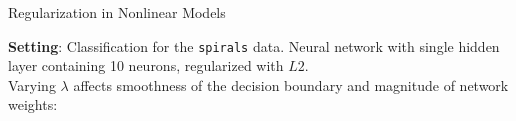 \documentclass[11pt,compress,t,notes=noshow, xcolor=table]{beamer}
\begin{document}
\begin{frame}{Regularization in Nonlinear Models}

\small
\textbf{Setting}: Classification for the \texttt{spirals} data.
Neural network with single hidden layer containing 10 neurons, regularized with $L2$. \\

Varying $\lambda$ affects smoothness of the decision boundary and magnitude of 
network weights:

\vfill


\end{frame}
\end{document}

